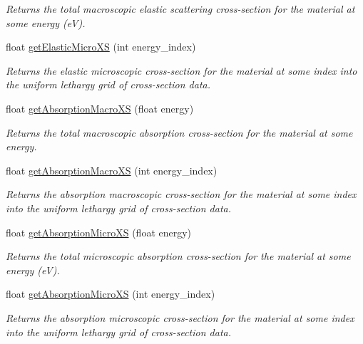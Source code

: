 \begin{DoxyCompactItemize}
\begin{DoxyCompactList}\small\item\em Returns the total macroscopic elastic scattering cross-\/section for the material at some energy (e\-V). \end{DoxyCompactList}\item 
float \hyperlink{classMaterial_a3dfbbc8b65a0f4e1f9aaa4a5c1ab50bd}{get\-Elastic\-Micro\-X\-S} (int energy\-\_\-index)
\begin{DoxyCompactList}\small\item\em Returns the elastic microscopic cross-\/section for the material at some index into the uniform lethargy grid of cross-\/section data. \end{DoxyCompactList}\item 
float \hyperlink{classMaterial_a310a3275a51710b8654bdaf46f61a801}{get\-Absorption\-Macro\-X\-S} (float energy)
\begin{DoxyCompactList}\small\item\em Returns the total macroscopic absorption cross-\/section for the material at some energy. \end{DoxyCompactList}\item 
float \hyperlink{classMaterial_a7538c8c5e94afc9ade32d68e4fef274b}{get\-Absorption\-Macro\-X\-S} (int energy\-\_\-index)
\begin{DoxyCompactList}\small\item\em Returns the absorption macroscopic cross-\/section for the material at some index into the uniform lethargy grid of cross-\/section data. \end{DoxyCompactList}\item 
float \hyperlink{classMaterial_a012882c863ee0c8c850cbfc29f175528}{get\-Absorption\-Micro\-X\-S} (float energy)
\begin{DoxyCompactList}\small\item\em Returns the total microscopic absorption cross-\/section for the material at some energy (e\-V). \end{DoxyCompactList}\item 
float \hyperlink{classMaterial_a1c5813f4c10fe648e4d7399e4fa3c46e}{get\-Absorption\-Micro\-X\-S} (int energy\-\_\-index)
\begin{DoxyCompactList}\small\item\em Returns the absorption microscopic cross-\/section for the material at some index into the uniform lethargy grid of cross-\/section data. \end{DoxyCompactList}\item 

\end{DoxyCompactItemize}
